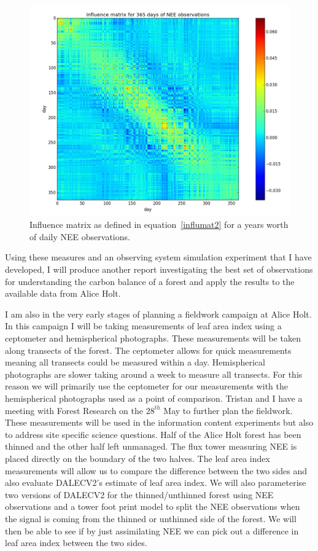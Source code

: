 \documentclass[11pt]{article}
\begin{document}
\begin{figure}[!ht]
    \centering
    \includegraphics[width=.5\textwidth]{365days_nee.png}
    \caption{Influence matrix as defined in equation~\ref{influmat2} for a years worth of daily NEE observations.}
    \label{fig:nee_IM}
\end{figure}

Using these measures and an observing system simulation experiment that I have developed, I will produce another report investigating the best set of observations for understanding the carbon balance of a forest and apply the results to the available data from Alice Holt. 

I am also in the very early stages of planning a fieldwork campaign at Alice Holt. In this campaign I will be taking measurements of leaf area index using a ceptometer and hemispherical photographs. These measurements will be taken along transects of the forest. The ceptometer allows for quick measurements meaning all transects could be measured within a day. Hemispherical photographs are slower taking around a week to measure all transects. For this reason we will primarily use the ceptometer for our measurements with the hemispherical photographs used as a point of comparison. Tristan and I have a meeting with Forest Research on the $28^{th}$ May to further plan the fieldwork. These measurements will be used in the information content experiments but also to address site specific science questions. Half of the Alice Holt forest has been thinned and the other half left unmanaged.  The flux tower measuring NEE is placed directly on the boundary of the two halves. The leaf area index measurements will allow us to compare the difference between the two sides and also evaluate DALECV2's estimate of leaf area index. We will also parameterise two versions of DALECV2 for the thinned/unthinned forest using NEE observations and a tower foot print model to split the NEE observations when the signal is coming from the thinned or unthinned side of the forest. We will then be able to see if by just assimilating NEE we can pick out a difference in leaf area index between the two sides.
\end{document}
